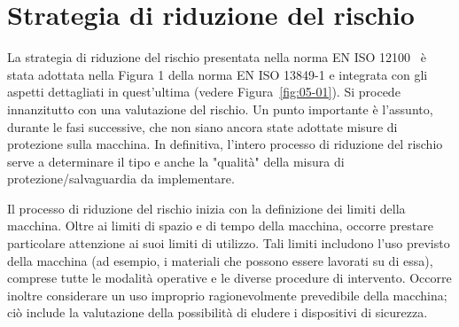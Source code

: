 \clearpage
\begin{center}
    \captionsetup{hypcap=false}
    \resizebox{\textwidth}{!}{}
    \label{fig:05-01}
\end{center}
\clearpage

\section{Strategia di riduzione del rischio}
\label{sec:05-2}

La strategia di riduzione del rischio presentata nella norma EN ISO 12100~\cite{eniso12100} è stata adottata nella Figura 1 della norma EN ISO 13849-1 e integrata con gli aspetti dettagliati in quest'ultima (vedere Figura~\ref{fig:05-01}). Si procede innanzitutto con una valutazione del rischio. Un punto importante è l'assunto, durante le fasi successive, che non siano ancora state adottate misure di protezione sulla macchina. In definitiva, l'intero processo di riduzione del rischio serve a determinare il tipo e anche la "qualità" della misura di protezione/salvaguardia da implementare.

Il processo di riduzione del rischio inizia con la definizione dei limiti della macchina. Oltre ai limiti di spazio e di tempo della macchina, occorre prestare particolare attenzione ai suoi limiti di utilizzo. Tali limiti includono l'uso previsto della macchina (ad esempio, i materiali che possono essere lavorati su di essa), comprese tutte le modalità operative e le diverse procedure di intervento. Occorre inoltre considerare un uso improprio ragionevolmente prevedibile della macchina; ciò include la valutazione della possibilità di eludere i dispositivi di sicurezza.



